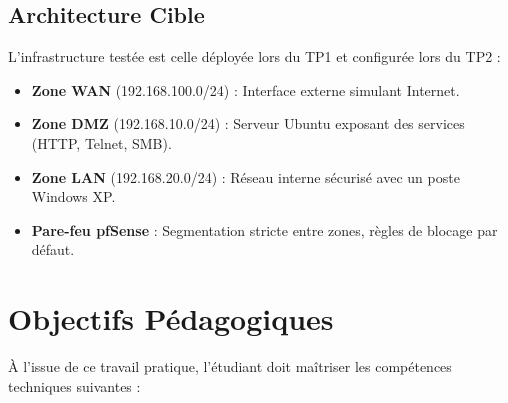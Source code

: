 \documentclass[12pt,a4paper,openany]{report}
\begin{document}
	\subsection{Architecture Cible}
	
	L'infrastructure testée est celle déployée lors du TP1 et configurée lors du TP2 :
	\begin{itemize}
		\item \textbf{Zone WAN} (192.168.100.0/24) : Interface externe simulant Internet.
		\item \textbf{Zone DMZ} (192.168.10.0/24) : Serveur Ubuntu exposant des services (HTTP, Telnet, SMB).
		\item \textbf{Zone LAN} (192.168.20.0/24) : Réseau interne sécurisé avec un poste Windows XP.
		\item \textbf{Pare-feu pfSense} : Segmentation stricte entre zones, règles de blocage par défaut.
	\end{itemize}
	
	\section{Objectifs Pédagogiques}
	
	À l'issue de ce travail pratique, l'étudiant doit maîtriser les compétences techniques suivantes :
	
\end{document}
